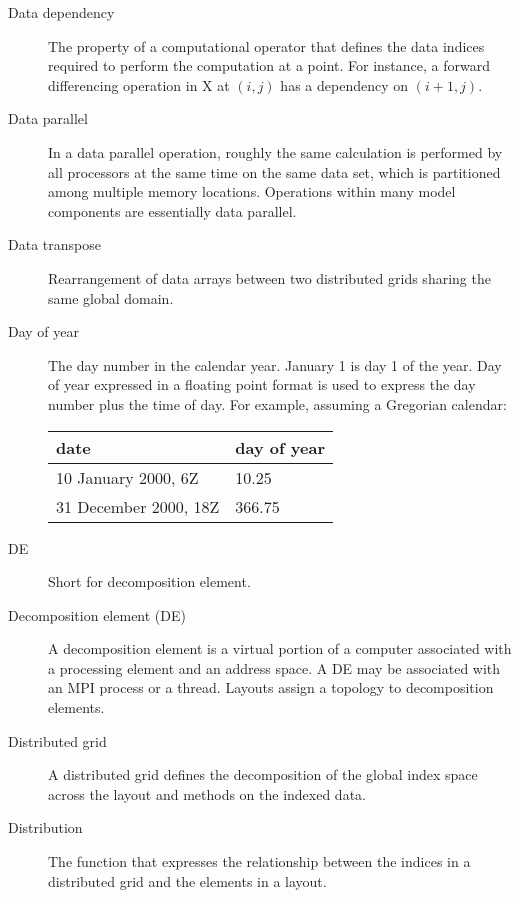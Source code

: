 \begin{description}
\item[Data dependency] \label{glos:DataDep} The property of a computational
  operator that defines the data indices required to perform
  the computation at a point.  For instance, a forward differencing
  operation in X at $(i,j)$ has a dependency on $(i+1,j)$.

\item[Data parallel] \label{glos:DataParallel} In a data parallel operation,
roughly the same calculation is performed by all processors at the same 
time on the same data set, which is partitioned among multiple memory 
locations.  Operations within many model components are essentially data 
parallel.  

\item[Data transpose] \label{glos:DataTranspose} Rearrangement of data arrays 
  between two distributed grids sharing the same global domain.

\item[Day of year] \label{glos:DayOfYear} The day number in the calendar year. 
January 1 is day 1 of the year. Day of year expressed in a floating point 
format is used to express the day number plus the time of day. 
For example, assuming a Gregorian calendar:

\begin{tabular}{ll}
{\bf date}              & {\bf day of year} \\
\hline 
10 January 2000, 6Z     & 10.25 \\
31 December 2000, 18Z   & 366.75 
\end{tabular}

\item[DE] \label{glos:DE} 
Short for decomposition element.

\item[Decomposition element (DE)] \label{glos:Decomp_Element}
A decomposition element is a virtual portion of a computer 
associated with a processing element and an address space.  A DE may 
be associated with an MPI process or a thread.  Layouts 
assign a topology to decomposition elements.

\item[Distributed grid] \label{glos:DistGrid}
  A distributed grid defines the decomposition of the global index space 
  across the layout and methods on the indexed data.

\item[Distribution] \label{glos:Distribution} The function that expresses
the relationship between the indices in a distributed grid and the elements 
in a layout.  


\end{description}
